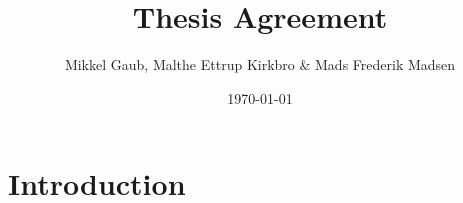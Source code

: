 \usepackage{cite}
\usepackage{hyperref}
\usepackage{placeins}

\author{Mikkel Gaub, Malthe Ettrup Kirkbro \& Mads Frederik Madsen}
\title{Thesis Agreement}
\date{\today}



\maketitle

	\section{Introduction}

	


	\begin{thebibliography}{9}
	\end{thebibliography}

